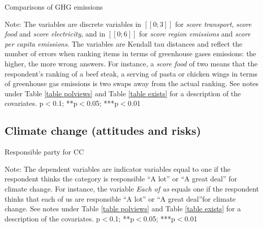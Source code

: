 \documentclass{article}
\begin{document}
\begin{table}[h!]
	\caption{Comparisons of GHG emissions}
	\begin{center}
		\scalebox{0.7}{}
	\end{center}
	{\footnotesize Note: The variables are discrete variables in $[\![ 0;3 ]\!]$ for \textit{score transport}, \textit{score food} and \textit{score electricity}, and in $[\![ 0;6 ]\!]$ for \textit{score region emissions} and \textit{score per capita emissions}. The variables are Kendall tau distances and reflect the number of errors when ranking items in terms of greenhouse gases emissions: the higher, the more wrong answers. For instance, a \textit{score food} of two means that the respondent's ranking of a beef steak, a serving of pasta or chicken wings in terms of greenhouse gas emissions is two swaps away from the actual ranking. See notes under Table \ref{table polviews} and Table \ref{table exists} for a description of the covariates.
	\newline *p$<$0.1; **p$<$0.05; ***p$<$0.01}
\end{table}		



\clearpage
\subsection{Climate change (attitudes and risks)}



\begin{landscape}
	\begin{table}[h!]
		\caption{Responsible party for CC}
		\begin{center}
			\scalebox{0.6}{}
		\end{center}
	{\footnotesize Note: The dependent variables are indicator variables equal to one if the respondent thinks the category is responsible ``A lot'' or ``A great deal'' for climate change. For instance, the variable \textit{Each of us} equals one if the respondent thinks that each of us are responsible ``A lot'' or ``A great deal''for climate change. See notes under Table \ref{table polviews} and Table \ref{table exists} for a description of the covariates.
	\newline *p$<$0.1; **p$<$0.05; ***p$<$0.01}
	\end{table}		
\end{landscape}
\end{document}
